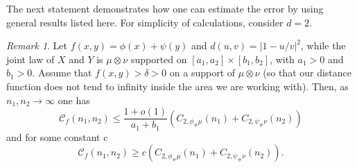 \documentclass{amsart}
\theoremstyle{remark}
\newtheorem{remark}[theorem]{Remark}
\numberwithin{equation}{section}
\numberwithin{figure}{section}
\begin{document}
The next statement demonstrates how one can estimate the error by using general results listed here. 
For simplicity of calculations, consider $d = 2$. 
\begin{remark}
	Let $f(x, y) = \phi(x) + \psi(y)$ and $d(u, v) = |1-u/v|^2$, while the joint law of $X$ and $Y$ is $\mu \otimes \nu$ supported on $[a_1, a_2] \times [b_1, b_2]$, with $a_1>0$ and $b_1 > 0$. Assume that $f(x, y) > \delta > 0$ on a support of $\mu \otimes \nu$ (so that our distance function does not tend to infinity inside the area we are working with). Then, as $n_1, n_2 \to \infty$ one has
	\[
	\mathcal{C}_f(n_1, n_2) \leq \frac{1+o(1)}{a_1 + b_1} (C_{2,\phi_\#\mu}(n_1) + C_{2,\psi_\#\nu}(n_2))
	\]
	and for some constant c
	\[
	\mathcal{C}_f(n_1, n_2) \geq c (C_{2,\phi_\#\mu}(n_1) + C_{2,\psi_\#\nu}(n_2)).
	\]
\end{remark}
\end{document}
